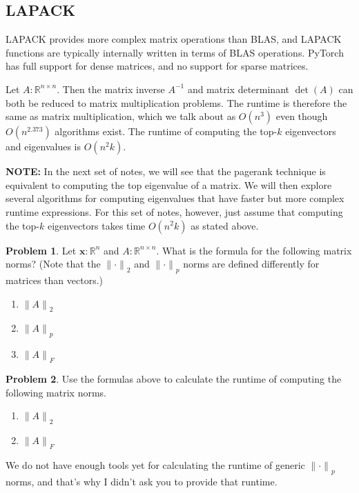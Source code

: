 \documentclass[10pt]{article}
\theoremstyle{definition}
\newtheorem{problem}{Problem}
\newcommand{\R}{\mathbb R}
\DeclareMathOperator{\determinant}{det}
\newcommand{\x}{\mathbf x}
\newcommand{\ltwo}[1]{{\lVert {#1} \rVert}_2}
\newcommand{\lp}[1]{{\lVert {#1} \rVert}_p}
\newcommand{\lF}[1]{{\lVert {#1} \rVert}_F}
\begin{document}
\newpage
\subsection{LAPACK}

LAPACK provides more complex matrix operations than BLAS,
and LAPACK functions are typically internally written in terms of BLAS operations.
PyTorch has full support for dense matrices,
and no support for sparse matrices.

Let $A : \R^{n \times n}$.
Then the matrix inverse $A^{-1}$ and matrix determinant $\determinant(A)$ can both be reduced to matrix multiplication problems.
The runtime is therefore the same as matrix multiplication, which we talk about as $O(n^3)$ even though $O(n^{2.373})$ algorithms exist.
The runtime of computing the top-$k$ eigenvectors and eigenvalues is $O(n^2k)$.

\textbf{NOTE:}
In the next set of notes, we will see that the pagerank technique is equivalent to computing the top eigenvalue of a matrix.
We will then explore several algorithms for computing eigenvalues that have faster but more complex runtime expressions.
For this set of notes, however, just assume that computing the top-$k$ eigenvectors takes time $O(n^2k)$ as stated above.

\begin{problem}
    Let $\x : \R^n$
    and 
    $A : \R^{n\times n}$.
    What is the formula for the following matrix norms?
    (Note that the $\ltwo{\cdot}$ and $\lp{\cdot}$ norms are defined differently for matrices than vectors.)
    \begin{enumerate}
        \item $\ltwo{A}$
            \vspace{2in}
        \item $\lp{A}$
            \vspace{2in}
        \item $\lF{A}$
            \vspace{2in}
    \end{enumerate}
\end{problem}

\newpage
\begin{problem}
    Use the formulas above to calculate the runtime of computing the following matrix norms.
    \begin{enumerate}
        \item $\ltwo{A}$
            \vspace{4in}
        \item $\lF{A}$
            \vspace{4in}
    \end{enumerate}
    We do not have enough tools yet for calculating the runtime of generic $\lp{\cdot}$ norms,
    and that's why I didn't ask you to provide that runtime.
\end{problem}
\end{document}
